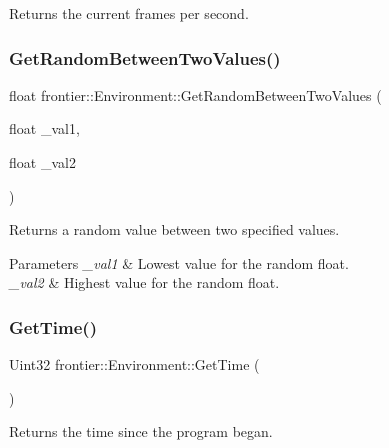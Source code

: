 Returns the current frames per second. 

\mbox{\label{classfrontier_1_1_environment_a89853da059a6ed4fc656d2e4f9f0fe07}} 
\subsubsection{\texorpdfstring{Get\+Random\+Between\+Two\+Values()}{GetRandomBetweenTwoValues()}}
{\footnotesize\ttfamily float frontier\+::\+Environment\+::\+Get\+Random\+Between\+Two\+Values (\begin{DoxyParamCaption}\item[{float}]{\+\_\+val1,  }\item[{float}]{\+\_\+val2 }\end{DoxyParamCaption})}



Returns a random value between two specified values. 


\begin{DoxyParams}{Parameters}
{\em \+\_\+val1} & Lowest value for the random float. \\
\hline
{\em \+\_\+val2} & Highest value for the random float. \\
\hline
\end{DoxyParams}
\mbox{\label{classfrontier_1_1_environment_afd2f6618895ffc061577512f318ab990}} 
\subsubsection{\texorpdfstring{Get\+Time()}{GetTime()}}
{\footnotesize\ttfamily Uint32 frontier\+::\+Environment\+::\+Get\+Time (\begin{DoxyParamCaption}{ }\end{DoxyParamCaption})}



Returns the time since the program began. 

\mbox{\label{classfrontier_1_1_environment_a1e5a50e5f54b908516a24b02672ebab0}} 
